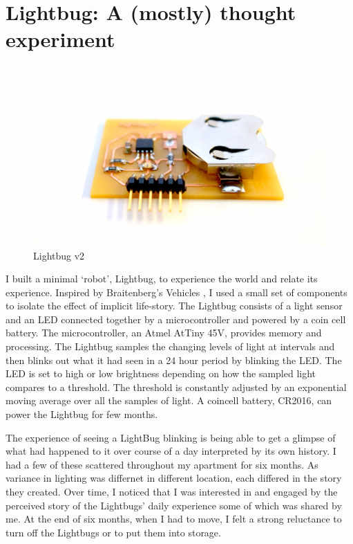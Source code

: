 

\chapter{Lightbug: A (mostly) thought experiment}
\label{chap_lightbug}

   \begin{figure}[thpb]
      \centering
      \includegraphics[width=5in]{figures/lightbug/lightbug.jpg}
      \caption{Lightbug v2}
      \label{fig_lightbug}
   \end{figure}



I built a minimal \lq robot\rq , Lightbug, to experience the world and relate its experience. Inspired by Braitenberg's Vehicles \cite{braitenberg_vehicles}, I used a small set of components to isolate the effect of implicit life-story. The Lightbug consists of a light sensor and an LED connected together by a microcontroller and powered by a coin cell battery. The microcontroller, an Atmel AtTiny 45V, provides memory and processing. The Lightbug samples the changing levels of light at intervals and then blinks out what it had seen in a 24 hour period by blinking the LED. The LED is set to high or low brightness depending on how the sampled light compares to a threshold. The threshold is constantly adjusted by an exponential moving average over all the samples of light. A coincell battery, CR2016, can power the Lightbug for few months.  

The experience of seeing a LightBug blinking is being able to get a glimpse of what had happened to it over course of a day interpreted by its own history. I had a few of these scattered throughout my apartment for six months. As variance in lighting was differnet in different location, each differed in the story they created. Over time, I noticed that I was interested in and engaged by the perceived story of the Lightbugs' daily experience some of which was shared by me. At the end of six months, when I had to move, I felt a strong reluctance to turn off the Lightbugs or to put them into storage. 

